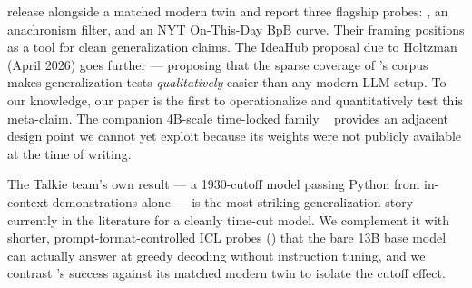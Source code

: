 \citet{talkielm2026} release \talkienineteen alongside a matched modern twin \talkieweb and report three flagship probes: \humaneval, an \mmlu anachronism filter, and an NYT On-This-Day BpB curve. Their framing positions \talkienineteen as a tool for clean generalization claims. The IdeaHub proposal due to Holtzman (April 2026) goes further --- proposing that the sparse coverage of \talkienineteen's corpus makes generalization tests \emph{qualitatively} easier than any modern-LLM setup. To our knowledge, our paper is the first to operationalize and quantitatively test this meta-claim. The companion 4B-scale time-locked family \rankefour~\citep{ranke4b2025} provides an adjacent design point we cannot yet exploit because its weights were not publicly available at the time of writing.

The Talkie team's own \humaneval result --- a 1930-cutoff model passing Python from in-context demonstrations alone --- is the most striking generalization story currently in the literature for a cleanly time-cut model. We complement it with shorter, prompt-format-controlled ICL probes () that the bare 13B base model can actually answer at greedy decoding without instruction tuning, and we contrast \talkienineteen's success against its matched modern twin to isolate the cutoff effect.

